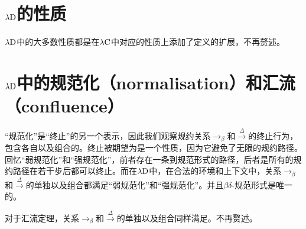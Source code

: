 \documentclass[UTF8]{article}
\begin{document}
	\section{$\lambda{\rm D}$的性质}
	\noindent
	$\lambda{\rm D}$中的大多数性质都是在$\lambda{\rm C}$中对应的性质上添加了定义的扩展，不再赘述。
	
	\section{$\lambda{\rm D}$中的规范化（normalisation）和汇流（confluence）}
	\noindent
	“规范化”是“终止”的另一个表示，因此我们观察规约关系$\rightarrow_\beta$和$\stackrel{\Delta}{\rightarrow}$的终止行为，包含各自以及组合的。终止被期望为是一个性质，因为它避免了无限的规约路径。回忆“弱规范化”和“强规范化”，前者存在一条到规范形式的路径，后者是所有的规约路径在若干步后都可以终止。而在$\lambda{\rm D}$中，在合法的环境和上下文中，关系$\rightarrow_\beta$和$\stackrel{\Delta}{\rightarrow}$的单独以及组合都满足“弱规范化”和“强规范化”。并且$\beta{\delta}$-规范形式是唯一的。
	
		对于汇流定理，关系$\rightarrow_\beta$和$\stackrel{\Delta}{\rightarrow}$的单独以及组合同样满足。不再赘述。
\end{document}
